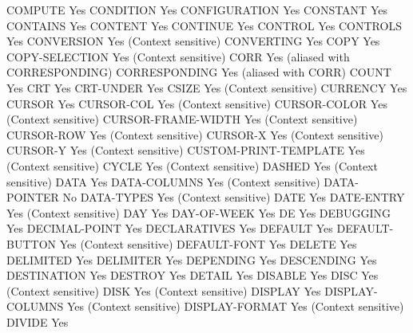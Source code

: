 COMPUTE                         Yes
CONDITION                       Yes
CONFIGURATION                   Yes
CONSTANT                        Yes
CONTAINS                        Yes
CONTENT                         Yes
CONTINUE                        Yes
CONTROL                         Yes
CONTROLS                        Yes
CONVERSION                      Yes (Context sensitive)
CONVERTING                      Yes
COPY                            Yes
COPY-SELECTION                  Yes (Context sensitive)
CORR                            Yes (aliased with CORRESPONDING)
CORRESPONDING                   Yes (aliased with CORR)
COUNT                           Yes
CRT                             Yes
CRT-UNDER                       Yes
CSIZE                           Yes (Context sensitive)
CURRENCY                        Yes
CURSOR                          Yes
CURSOR-COL                      Yes (Context sensitive)
CURSOR-COLOR                    Yes (Context sensitive)
CURSOR-FRAME-WIDTH              Yes (Context sensitive)
CURSOR-ROW                      Yes (Context sensitive)
CURSOR-X                        Yes (Context sensitive)
CURSOR-Y                        Yes (Context sensitive)
CUSTOM-PRINT-TEMPLATE           Yes (Context sensitive)
CYCLE                           Yes (Context sensitive)
DASHED                          Yes (Context sensitive)
DATA                            Yes
DATA-COLUMNS                    Yes (Context sensitive)
DATA-POINTER                    No
DATA-TYPES                      Yes (Context sensitive)
DATE                            Yes
DATE-ENTRY                      Yes (Context sensitive)
DAY                             Yes
DAY-OF-WEEK                     Yes
DE                              Yes
DEBUGGING                       Yes
DECIMAL-POINT                   Yes
DECLARATIVES                    Yes
DEFAULT                         Yes
DEFAULT-BUTTON                  Yes (Context sensitive)
DEFAULT-FONT                    Yes
DELETE                          Yes
DELIMITED                       Yes
DELIMITER                       Yes
DEPENDING                       Yes
DESCENDING                      Yes
DESTINATION                     Yes
DESTROY                         Yes
DETAIL                          Yes
DISABLE                         Yes
DISC                            Yes (Context sensitive)
DISK                            Yes (Context sensitive)
DISPLAY                         Yes
DISPLAY-COLUMNS                 Yes (Context sensitive)
DISPLAY-FORMAT                  Yes (Context sensitive)
DIVIDE                          Yes
